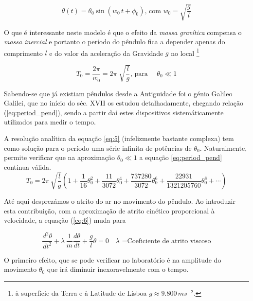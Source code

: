 \documentclass[a4paper,twoside,12pt]{article}      %
\begin{document}
\begin{equation}
	\label{eq:solu_pend}
\theta (t) = \theta_0 \sin(w_0 \, t + \phi_0) \text{, com } w_0 = \sqrt{\frac{g}{l}}
\end{equation}

O que é interessante neste modelo é que o efeito da \emph{massa gravítica } compensa o \emph{massa inercial } e portanto o período do pêndulo fica a  depender apenas do comprimento $l$  e do valor da aceleração da Gravidade $g$ no local 
\footnote{à superfície da Terra e à Latitude de Lisboa $g\approx 9.800\,m s^{-2}$.}

\begin{equation}
	\label{eq:period_pend}
T_0 = \frac{2 \pi}{w_0} = 2\pi\; \sqrt{\frac{l}{g}} \text{, para }	\quad \theta_0 \ll 1
\end{equation}

Sabendo-se que já existiam pêndulos  desde a Antiguidade foi o génio  Galileo Galilei, que no início do séc. XVII os estudou detalhadamente, chegando relação (\ref{eq:period_pend}), sendo a partir daí 
estes dispositivos sistemáticamente utilizados para medir o tempo.

A resolução analítica da equação 	\ref{eq:5} (infelizmente bastante complexa) tem como solução para o período uma série  infinita de potências de $\theta_0$. 
Naturalmente, permite verificar que na aproximação $\theta_0 \ll 1$ a equação \ref{eq:period_pend} continua válida.
\begin{equation}
	\label{eq:period_pend_exa}
T_0 =  2\pi\, \sqrt{\frac{l}{g}} \left(1 + \frac{1}{16} \theta_0^{2} + \frac{11}{3072} \theta_0^{4} +
 \frac{737280}{3072} \theta_0^{6} + \frac{22931}{1321205760} \theta_0^{8} + \cdots \right)
\end{equation}

Até aqui desprezámos o atrito do ar no movimento do pêndulo. Ao introduzir esta contribuição, com a aproximação de atrito cinético 
proporcional à velocidade, a  equação	(\ref{eq:6}) muda para

\begin{equation}
	 \frac{d^2 \theta}{dt^2} + \lambda \, \frac{1}{m}  \frac{d \theta}{dt} + \frac{g}{l} \theta =0 \quad \lambda \text{ =Coeficiente de atrito viscoso}
\end{equation}

O primeiro efeito, que se pode verificar no laboratório é na amplitude do movimento $\theta_0$ que irá diminuir inexoravelmente com o tempo. 
\end{document}
